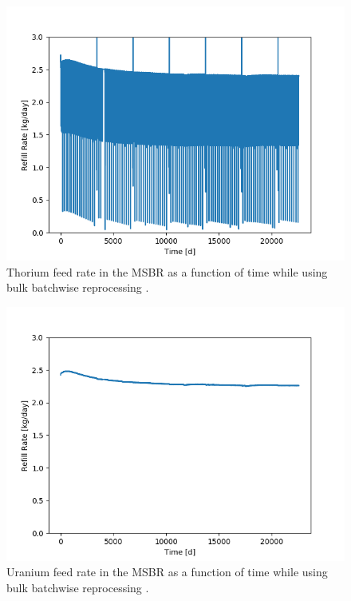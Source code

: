 
\begin{figure}[H]
  \centering
  \includegraphics[scale=0.7]{images/Th232rem_massv01.png}
  \caption{Thorium feed rate in the MSBR as a function of time while using bulk batchwise reprocessing \cite{rykhlevskii_advanced_2018}.}
   \label{fig:Th-feed-v1}
\end{figure}

\begin{figure}[H]
  \centering
  \includegraphics[scale=0.7]{images/Pa233rem_massv01.png}
  \caption{Uranium feed rate in the MSBR as a function of time while using bulk batchwise reprocessing \cite{rykhlevskii_advanced_2018}.}
   \label{fig:U-feed-v1}
\end{figure}

